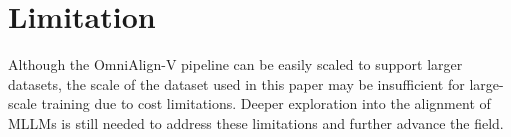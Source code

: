 \section{Limitation}
Although the OmniAlign-V pipeline can be easily scaled to support larger datasets, the scale of the dataset used in this paper may be insufficient for large-scale training due to cost limitations. 
Deeper exploration into the alignment of MLLMs is still needed to address these limitations and further advance the field.